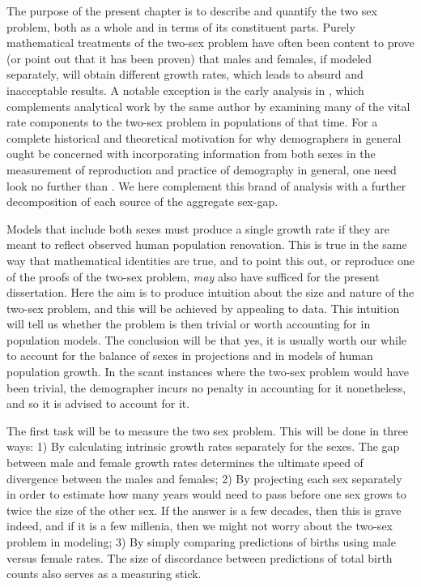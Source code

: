 \label{ch:Measuring}
The purpose of the present chapter is to describe and quantify the two sex
problem, both as a whole and in terms of its constituent parts. Purely
mathematical treatments of the two-sex problem have often been content to 
prove (or point out that it has been proven) that males and females,
if modeled separately, will obtain different growth rates, which leads to
absurd and inacceptable results. A notable exception is the early analysis in
\citet{karmel1948analysis}, which complements analytical work by the same author
\citep{karmel1947relations,karmel1948relations} by examining many of the vital
rate components to the two-sex problem in populations of that time. For a
complete historical and theoretical motivation for why demographers in general
ought be concerned with incorporating information from both sexes in the measurement of reproduction
and practice of demography in general, one need look no further than
\citet{francisco1996dissertation}. We here complement this brand of analysis
with a further decomposition of each source of the aggregate sex-gap.

Models that include both sexes must produce a single growth 
rate if they are meant to reflect observed human population renovation. 
This is true in the same way that mathematical identities are true, and to 
point this out, or reproduce one of the proofs of the two-sex problem, \textit{may} 
also have sufficed for the present dissertation. Here the aim is to produce intuition 
about the size and nature of the two-sex problem, and this will be
achieved by appealing to data. This intuition will tell us whether the 
problem is then trivial or worth accounting for in
population models. The conclusion will be that yes, it is usually worth our
while to account for the balance of sexes in projections and in models of human
population growth. In the scant instances where the two-sex problem would have
been trivial, the demographer incurs no penalty in accounting for it
nonetheless, and so it is advised to account for it.

The first task will be to measure the two sex problem. This will be done in
three ways: 1) By calculating intrinsic growth rates separately for the sexes.
The gap between male and female growth rates determines the ultimate speed of
divergence between the males and females; 2) By projecting each sex separately
in order to estimate how many years would need to pass before one sex grows to
twice the size of the other sex. If the answer is a few decades, then this is
grave indeed, and if it is a few millenia, then we might not worry about the
two-sex problem in modeling; 3) By simply comparing predictions of births using
male versus female rates. The size of discordance between predictions of total
birth counts also serves as a measuring stick.

